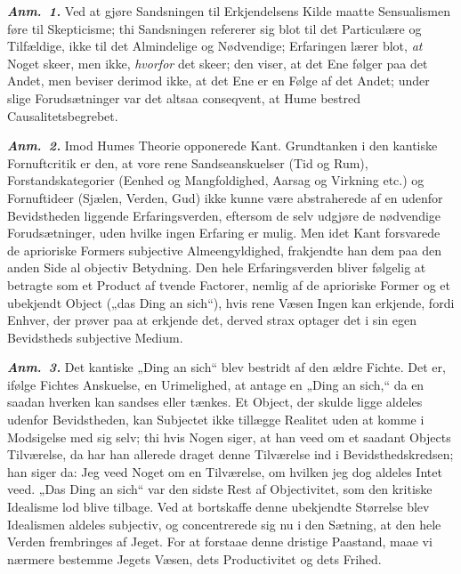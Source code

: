 \documentclass[12pt]{book}
\newcommand{\anm}[1]{\emph{\textbf{Anm.~#1.}}}
\newcommand{\opage}[1]{\marginnote{\footnotesize\textit{[#1]}}}
\begin{document}
\anm{1} Ved at gjøre Sandsningen til Erkjendelsens Kilde maatte Sensualismen
føre til Skepticisme; thi Sandsningen refererer sig blot til det Particulære
og Tilfældige, ikke til det Almindelige og Nødvendige; Erfaringen lærer blot,
\emph{at} Noget skeer, men ikke, \emph{hvorfor} det skeer; den viser, at det
Ene følger paa det Andet, men beviser derimod ikke, at det Ene er en Følge af
det Andet; under slige Forudsætninger var det altsaa conseqvent, at Hume
bestred Causalitetsbegrebet.

\anm{2} Imod Humes Theorie opponerede Kant. Grundtanken i den kantiske
Fornuftcritik er den, at vore rene Sandseanskuelser (Tid og Rum),
Forstandskategorier (Eenhed og Mangfoldighed, Aarsag og Virkning etc.) og
Fornuftideer (Sjælen, Verden, Gud) ikke kunne være abstraherede af en udenfor
Bevidstheden liggende Erfaringsverden, eftersom de selv udgjøre de nødvendige
Forudsætninger, uden hvilke ingen Erfaring er mulig. Men idet Kant forsvarede
de aprioriske Formers subjective Almeengyldighed, frakjendte han dem paa den
anden Side al objectiv Betydning. Den hele Erfaringsverden bliver følgelig at
betragte som et Product af tvende Factorer, nemlig af de aprioriske Former og
et ubekjendt Object („das Ding an sich“), hvis rene Væsen Ingen kan erkjende,
fordi Enhver, der prøver paa at erkjende det, derved strax optager det i sin
egen Bevidstheds subjective Medium.

\opage{3} \anm{3} Det kantiske „Ding an sich“ blev bestridt af den ældre Fichte. Det
er, ifølge Fichtes Anskuelse, en Urimelighed, at antage en „Ding an sich,“ da
en saadan hverken kan sandses eller tænkes. Et Object, der skulde ligge
aldeles udenfor Bevidstheden, kan Subjectet ikke tillægge Realitet uden at
komme i Modsigelse med sig selv; thi hvis Nogen siger, at han veed om et
saadant Objects Tilværelse, da har han allerede draget denne Tilværelse ind i
Bevidsthedskredsen; han siger da: Jeg veed Noget om en Tilværelse, om hvilken
jeg dog aldeles Intet veed. „Das Ding an sich“ var den sidste Rest af
Objectivitet, som den kritiske Idealisme lod blive tilbage. Ved at bortskaffe
denne ubekjendte Størrelse blev Idealismen aldeles subjectiv, og concentrerede
sig nu i den Sætning, at den hele Verden frembringes af Jeget. For at forstaae
denne dristige Paastand, maae vi nærmere bestemme Jegets Væsen, dets
Productivitet og dets Frihed.
\end{document}
